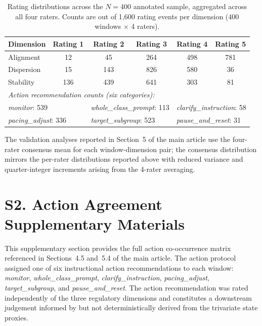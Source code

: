 \documentclass[preprint,12pt,authoryear]{elsarticle}
\begin{document}
\begin{table}[h]
\centering
\caption{Rating distributions across the $N = 400$ annotated sample, aggregated across all four raters. Counts are out of 1{,}600 rating events per dimension (400 windows $\times$ 4 raters).}
\label{tab:annot-distributions}
\begin{tabular}{lccccc}
\hline
Dimension & Rating 1 & Rating 2 & Rating 3 & Rating 4 & Rating 5 \\
\hline
Alignment & 12 & 45 & 264 & 498 & 781 \\
Dispersion & 15 & 143 & 826 & 580 & 36 \\
Stability & 136 & 439 & 641 & 303 & 81 \\
\hline
\multicolumn{6}{l}{\textit{Action recommendation counts (six categories):}} \\
\hline
\multicolumn{2}{l}{\textit{monitor}: 539} & \multicolumn{2}{l}{\textit{whole\_class\_prompt}: 113} & \multicolumn{2}{l}{\textit{clarify\_instruction}: 58} \\
\multicolumn{2}{l}{\textit{pacing\_adjust}: 336} & \multicolumn{2}{l}{\textit{target\_subgroup}: 523} & \multicolumn{2}{l}{\textit{pause\_and\_reset}: 31} \\
\hline
\end{tabular}
\end{table}

The validation analyses reported in Section~5 of the main article use the four-rater consensus mean for each window-dimension pair; the consensus distribution mirrors the per-rater distributions reported above with reduced variance and quarter-integer increments arising from the 4-rater averaging.

\vspace{2em}


\section*{S2. Action Agreement Supplementary Materials}
\label{supp:action}

This supplementary section provides the full action co-occurrence matrix referenced in Sections~4.5 and~5.4 of the main article. The action protocol assigned one of six instructional action recommendations to each window: \textit{monitor}, \textit{whole\_class\_prompt}, \textit{clarify\_instruction}, \textit{pacing\_adjust}, \textit{target\_subgroup}, and \textit{pause\_and\_reset}. The action recommendation was rated independently of the three regulatory dimensions and constitutes a downstream judgement informed by but not deterministically derived from the trivariate state proxies.
\end{document}
